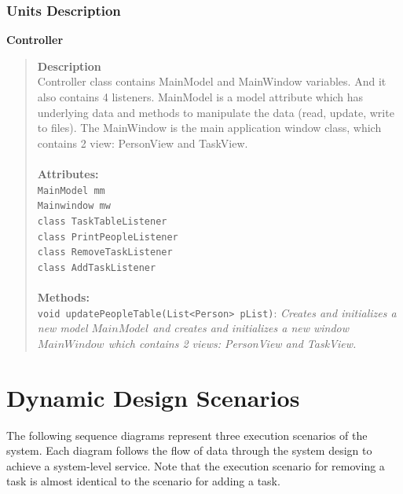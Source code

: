 \documentclass[12pt]{article}
\begin{document}
\subsubsection{Units Description}

{\bf Controller}
\begin{quote}
{\bf Description}\\
Controller class contains MainModel and MainWindow variables. And it also contains 4 listeners. MainModel is a model attribute which has underlying data and methods to manipulate the data (read, update, write to files). The MainWindow is the main application window class, which contains 2 view: PersonView and TaskView.\\\\
{\bf Attributes:}\\
\texttt{MainModel mm}\\
\texttt{Mainwindow mw}\\
\texttt{class TaskTableListener}\\
\texttt{class PrintPeopleListener}\\
\texttt{class RemoveTaskListener}\\
\texttt{class AddTaskListener}\\\\
{\bf Methods:}\\
\texttt{void updatePeopleTable(List<Person> pList)}: \emph{Creates and initializes a new model \(MainModel\) and creates and initializes a new window \(MainWindow\) which contains 2 views: PersonView and TaskView.}
\end{quote}

\section{Dynamic Design Scenarios}

The following sequence diagrams represent three execution scenarios of the system. Each diagram follows the flow of data through the system design to achieve a system-level service. Note that the execution scenario for removing a task is almost identical to the scenario for adding a task.
\end{document}
